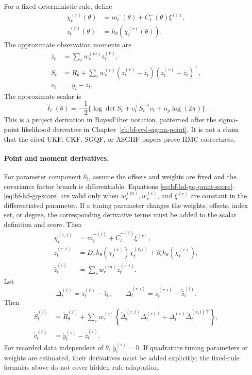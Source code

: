 For a fixed deterministic rule, define
\begin{align}
  \chi_t^{(r)}(\theta)
  &=m_t^-(\theta)+C_t^-(\theta)\xi^{(r)},\\
  z_t^{(r)}(\theta)
  &=h_\theta(\chi_t^{(r)}(\theta)).
  \label{eq:bf-hd-gq-cloud}
\end{align}
The approximate observation moments are
\begin{align}
  \bar z_t&=\sum_r w_r^{(m)}z_t^{(r)},\\
  S_t&=R_\theta+\sum_r w_r^{(c)}
    (z_t^{(r)}-\bar z_t)(z_t^{(r)}-\bar z_t)^\top,\\
  v_t&=y_t-\bar z_t.
  \label{eq:bf-hd-gq-likelihood-objects}
\end{align}
The approximate scalar is
\begin{equation}
  \widehat\ell_t(\theta)
  =
  -\frac12
  \{\log\det S_t+v_t^\top S_t^{-1}v_t+n_y\log(2\pi)\}.
  \label{eq:bf-hd-gq-loglik}
\end{equation}
This is a project derivation in BayesFilter notation, patterned after the
sigma-point likelihood derivative in Chapter~\ref{ch:bf-svd-sigma-point}.  It
is not a claim that the cited UKF, CKF, SGQF, or ASGHF papers prove HMC
correctness.

\paragraph{Point and moment derivatives.}
For parameter component \(\theta_i\), assume the offsets and weights are fixed
and the covariance factor branch is differentiable.  Equations
\eqref{eq:bf-hd-gq-point-score}--\eqref{eq:bf-hd-gq-score} are valid only when
\(w_r^{(m)},w_r^{(c)}\), and \(\xi^{(r)}\) are constant in the differentiated
parameter.  If a tuning parameter changes the weights, offsets, index set, or
degree, the corresponding derivative terms must be added to the scalar
definition and score.  Then
\begin{align}
  \dot\chi_t^{(r,i)}
  &=
  \dot m_t^{-(i)}+\dot C_t^{-(i)}\xi^{(r)},\\
  \dot z_t^{(r,i)}
  &=
  D_xh_\theta(\chi_t^{(r)})\dot\chi_t^{(r,i)}
  +\partial_i h_\theta(\chi_t^{(r)}),\\
  \dot{\bar z}_t^{(i)}
  &=
  \sum_r w_r^{(m)}\dot z_t^{(r,i)}.
  \label{eq:bf-hd-gq-point-score}
\end{align}
Let
\[
  \Delta_t^{(r)}=z_t^{(r)}-\bar z_t,\qquad
  \dot\Delta_t^{(r,i)}=\dot z_t^{(r,i)}-\dot{\bar z}_t^{(i)}.
\]
Then
\begin{align}
  \dot S_t^{(i)}
  &=
  \dot R_\theta^{(i)}
  +
  \sum_r w_r^{(c)}
  \left\{
    \dot\Delta_t^{(r,i)}\Delta_t^{(r)\top}
    +\Delta_t^{(r)}\dot\Delta_t^{(r,i)\top}
  \right\},\\
  \dot v_t^{(i)}
  &=
  \dot y_t^{(i)}-\dot{\bar z}_t^{(i)}.
  \label{eq:bf-hd-gq-S-v-score}
\end{align}
For recorded data independent of \(\theta\), \(\dot y_t^{(i)}=0\).  If
quadrature tuning parameters or weights are estimated, their derivatives must
be added explicitly; the fixed-rule formulas above do not cover hidden rule
adaptation.

